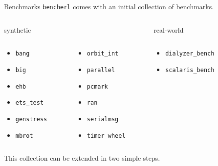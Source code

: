 \documentclass{beamer}
\begin{document}
\begin{frame}[t]{Benchmarks}
	\texttt{bencherl} comes with an initial collection of benchmarks.
    \vspace{10pt}
	\begin{columns}[t]
		\begin{column}{0.5\textwidth}
			\centering
			\textcolor{burgundy}{synthetic}
                        \vskip 6pt
			\begin{columns}
				\begin{column}{0.45\textwidth}
					\begin{itemize}
						\item[] \texttt{bang}
						\item[] \texttt{big}
						\item[] \texttt{ehb}
						\item[] \texttt{ets\_test}
						\item[] \texttt{genstress}
						\item[] \texttt{mbrot}
					\end{itemize}
				\end{column}
				\begin{column}{0.5\textwidth}
					\begin{itemize}
						\item[] \texttt{orbit\_int}
						\item[] \texttt{parallel}
						\item[] \texttt{pcmark}
						\item[] \texttt{ran}
						\item[] \texttt{serialmsg}
						\item[] \texttt{timer\_wheel}
					\end{itemize}
				\end{column}
			\end{columns}
		\end{column}
                \vrule
        \begin{column}{0.3\textwidth}
			\centering	
			\textcolor{burgundy}{real-world}
                        \vskip 6pt
			\begin{columns}
			  \begin{column}{\textwidth}
			    \begin{itemize}
			    \item[] \texttt{dialyzer\_bench}
			    \item[] \texttt{scalaris\_bench}
			    \end{itemize}
                          \end{column}
                        \end{columns}
        \end{column}
	\end{columns}	
	\vspace{20pt}
	This collection can be \textcolor{burgundy}{extended} in two simple steps.
\end{frame}
\end{document}
